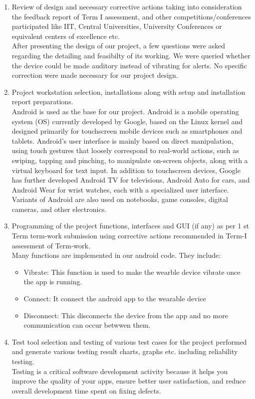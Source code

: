 \documentclass[12pt,a4paper]{report}
\begin{document}
\begin{appendices}
\begin{enumerate}
	\item Review of design and necessary corrective actions taking into consideration the feedback report of Term I assessment, and other competitions/conferences participated like IIT, Central Universities, University Conferences or equivalent centers of excellence etc.\\
	After presenting the design of our project, a few questions were asked regarding the detailing and feasibilty of its working. We were queried whether the device could be made auditory instead of vibrating for alerts. No specific correction were made necessary for our project design.
	\item Project workstation selection, installations along with setup and installation report preparations.\\
	Android is used as the base for our project.
	Android is a mobile operating system (OS) currently developed by Google, based on the Linux kernel and designed primarily for touchscreen mobile devices such as smartphones and tablets. Android's user interface is mainly based on direct manipulation, using touch gestures that loosely correspond to real-world actions, such as swiping, tapping and pinching, to manipulate on-screen objects, along with a virtual keyboard for text input. In addition to touchscreen devices, Google has further developed Android TV for televisions, Android Auto for cars, and Android Wear for wrist watches, each with a specialized user interface. Variants of Android are also used on notebooks, game consoles, digital cameras, and other electronics.
	\item Programming of the project functions, interfaces and GUI (if any) as
	per 1 st Term term-work submission using corrective actions recommended in Term-I assessment of Term-work.\\
	Many functions are implemented in our android code. They include:
	\begin{itemize}
		\item Vibrate: This function is used to make the wearble device vibrate once the app is running.
		\item Connect: It connect the android app to the wearable device 
		\item Disconnect: This disconnects the device from the app and no more communication can occur betwwen them.
		
	\end{itemize}
	
	\item Test tool selection and testing of various test cases for the project performed and generate various testing result charts, graphs etc. including
	reliability testing.\\
	Testing is a critical software development activity because it helps you improve the quality of your apps, ensure better user satisfaction, and reduce overall development time spent on fixing defects.
	

\end{enumerate}
\end{appendices}
\end{document}
